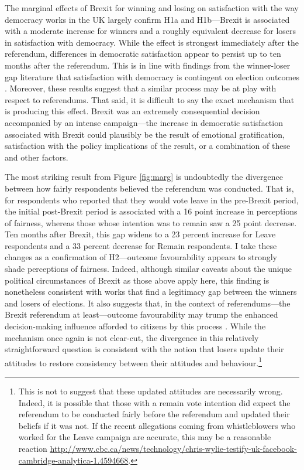 \documentclass[12pt, letter]{article}
\begin{document}
The marginal effects of Brexit for winning and losing on satisfaction with the way democracy works in the UK largely confirm H1a and H1b---Brexit is associated with a moderate increase for winners and a roughly equivalent decrease for losers in satisfaction with democracy. While the effect is strongest immediately after the referendum, differences in democratic satisfaction appear to persist up to ten months after the referendum. This is in line with findings from the winner-loser gap literature that satisfaction with democracy is contingent on election outcomes \parencite{anderson2002winning, anderson2005losers, blais2007winning, bowler2002democracy}. Moreover, these results suggest that a similar process may be at play with respect to referendums. That said, it is difficult to say the exact mechanism that is producing this effect. Brexit was an extremely consequential decision accompanied by an intense campaign---the increase in democratic satisfaction associated with Brexit could plausibly be the result of emotional gratification, satisfaction with the policy implications of the result, or a combination of these and other factors. 

The most striking result from Figure \ref{fig:marg} is undoubtedly the divergence between how fairly respondents believed the referendum was conducted. That is, for respondents who reported that they would vote leave in the pre-Brexit period, the initial post-Brexit period is associated with a 16 point increase in perceptions of fairness, whereas those whose intention was to remain saw a 25 point decrease. Ten months after Brexit, this gap widens to a 23 percent increase for Leave respondents and a 33 percent decrease for Remain respondents. I take these changes as a confirmation of H2---outcome favourability appears to strongly shade perceptions of fairness. Indeed, although similar caveats about the unique political circumstances of Brexit as those above apply here, this finding is nonetheless consistent with works that find a legitimacy gap between the winners and losers of elections. It also suggests that, in the context of referendums---the Brexit referendum at least---outcome favourability may trump the enhanced decision-making influence afforded to citizens by this process \parencite{arnesen2017legitimacy}. While the mechanism once again is not clear-cut, the divergence in this relatively straightforward question is consistent with the notion that losers update their attitudes to restore consistency between their attitudes and behaviour.\footnote{This is not to suggest that these updated attitudes are necessarily wrong. Indeed, it is possible that those with a remain vote intention did expect the referendum to be conducted fairly before the referendum and updated their beliefs if it was not. If the recent allegations coming from whistleblowers who worked for the Leave campaign are accurate, this may be a reasonable reaction \url{http://www.cbc.ca/news/technology/chris-wylie-testify-uk-facebook-cambridge-analytica-1.4594668}.}
\end{document}
